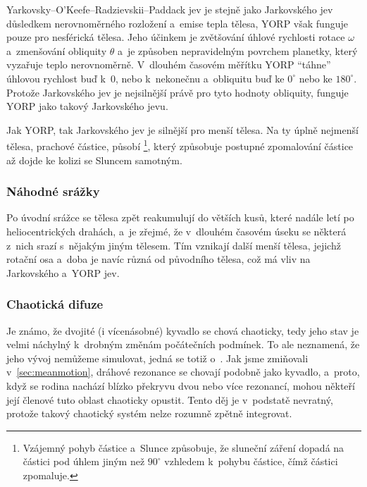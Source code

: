 \documentclass[A4paper, 12pt, oneside]{book}
\begin{document}
Yarkovsky–O'Keefe–Radzievskii–Paddack jev je stejně jako Jarkovského jev důsledkem nerovnoměrného rozložení a~emise tepla tělesa, YORP však funguje pouze pro nesférická tělesa. Jeho účinkem je zvětšování úhlové rychlosti rotace $\omega$ a~zmenšování obliquity $\theta$ a~je způsoben nepravidelným povrchem planetky, který vyzařuje teplo nerovnoměrně. V~dlouhém časovém měřítku YORP \enquote{táhne} úhlovou rychlost buď k~$0$, nebo k~nekonečnu a~obliquitu buď ke $0^\circ$ nebo ke $180^\circ$. Protože Jarkovského jev je nejsilnější právě pro tyto hodnoty obliquity, funguje YORP jako takový  Jarkovského jevu. 

Jak YORP, tak Jarkovského jev je silnější pro menší tělesa. Na ty úplně nejmenší tělesa, prachové částice, působí \footnote{Vzájemný pohyb částice a~Slunce způsobuje, že sluneční záření dopadá na částici pod úhlem jiným než $90^\circ$ vzhledem k~pohybu částice, čímž částici zpomaluje.}, který způsobuje postupné zpomalování částice až dojde ke kolizi se Sluncem samotným. 

\subsubsection{Náhodné srážky}
Po úvodní srážce se tělesa zpět reakumulují do větších kusů, které nadále letí po heliocentrických drahách, a~je zřejmé, že v~dlouhém časovém úseku se některá z~nich srazí s~nějakým jiným tělesem. Tím vznikají další menší tělesa, jejichž rotační osa a~doba je navíc různá od původního tělesa, což má vliv na Jarkovského a~YORP jev. 

\subsubsection{Chaotická difuze}
Je známo, že dvojité (i vícenásobné) kyvadlo se chová chaoticky, tedy jeho stav je velmi náchylný k~drobným změnám počátečních podmínek. To ale neznamená, že jeho vývoj nemůžeme simulovat, jedná se totiž o~. Jak jsme zmiňovali v~\ref{sec:meanmotion}, dráhové rezonance se chovají podobně jako kyvadlo, a~proto, když se rodina nachází blízko překryvu dvou nebo více rezonancí, mohou někteří její členové tuto oblast chaoticky opustit. Tento děj je v~podstatě nevratný, protože takový chaotický systém nelze rozumně zpětně integrovat.
\end{document}
